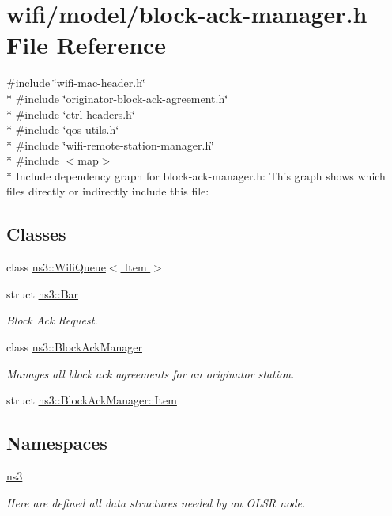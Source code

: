 \hypertarget{block-ack-manager_8h}{}\section{wifi/model/block-\/ack-\/manager.h File Reference}
\label{block-ack-manager_8h}
{\ttfamily \#include \char`\"{}wifi-\/mac-\/header.\+h\char`\"{}}\\*
{\ttfamily \#include \char`\"{}originator-\/block-\/ack-\/agreement.\+h\char`\"{}}\\*
{\ttfamily \#include \char`\"{}ctrl-\/headers.\+h\char`\"{}}\\*
{\ttfamily \#include \char`\"{}qos-\/utils.\+h\char`\"{}}\\*
{\ttfamily \#include \char`\"{}wifi-\/remote-\/station-\/manager.\+h\char`\"{}}\\*
{\ttfamily \#include $<$map$>$}\\*
Include dependency graph for block-\/ack-\/manager.h\+:
This graph shows which files directly or indirectly include this file\+:
\subsection*{Classes}
\begin{DoxyCompactItemize}
\item 
class \hyperlink{classns3_1_1WifiQueue}{ns3\+::\+Wifi\+Queue$<$ Item $>$}
\item 
struct \hyperlink{structns3_1_1Bar}{ns3\+::\+Bar}
\begin{DoxyCompactList}\small\item\em Block Ack Request. \end{DoxyCompactList}\item 
class \hyperlink{classns3_1_1BlockAckManager}{ns3\+::\+Block\+Ack\+Manager}
\begin{DoxyCompactList}\small\item\em Manages all block ack agreements for an originator station. \end{DoxyCompactList}\item 
struct \hyperlink{structns3_1_1BlockAckManager_1_1Item}{ns3\+::\+Block\+Ack\+Manager\+::\+Item}
\end{DoxyCompactItemize}
\subsection*{Namespaces}
\begin{DoxyCompactItemize}
\item 
 \hyperlink{namespacens3}{ns3}
\begin{DoxyCompactList}\small\item\em Here are defined all data structures needed by an O\+L\+SR node. \end{DoxyCompactList}\end{DoxyCompactItemize}
